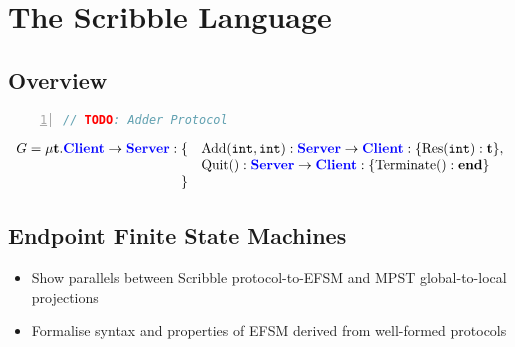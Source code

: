 \section{The Scribble Language}

\subsection{Overview}



\begin{lstlisting}[language=Java,numbers=left,frame=single]
// TODO: Adder Protocol
\end{lstlisting}

\[
\begin{array}{rl}
G = \mu\mathbf{t}.{\color{blue}\mathbf{Client}}\to{\color{blue}\mathbf{Server}}:\{
& \text{Add}(\texttt{int}, \texttt{int}): {\color{blue}\mathbf{Server}}\to{\color{blue}\mathbf{Client}}: \{\text{Res}(\texttt{int}): \mathbf{t}\}, \\
& \text{Quit}(): {\color{blue}\mathbf{Server}}\to{\color{blue}\mathbf{Client}}: \{\text{Terminate}(): \mathbf{end}\}\\
\} &
\end{array}
\]


\subsection{Endpoint Finite State Machines}
\begin{itemize}
\item Show parallels between Scribble protocol-to-EFSM and MPST global-to-local projections
\item Formalise syntax and properties of EFSM derived from well-formed protocols
\end{itemize}

